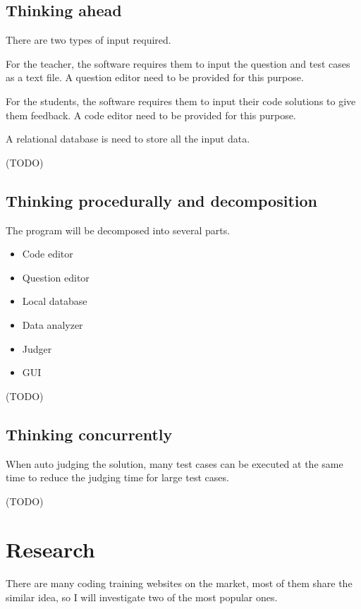 \documentclass[a4paper]{report}
\begin{document}
\subsection{Thinking ahead}

There are two types of input required.

For the teacher, the software requires them to input the question and test cases as a text file. A question editor need to be provided for this purpose.

For the students, the software requires them to input their code solutions to give them feedback. A code editor need to be provided for this purpose.

A relational database is need to store all the input data.

(TODO)

\subsection{Thinking procedurally and decomposition}

The program will be decomposed into several parts.

\begin{itemize}
    \item Code editor
    \item Question editor
    \item Local database
    \item Data analyzer
    \item Judger
    \item GUI
\end{itemize}

(TODO)

\subsection{Thinking concurrently}

When auto judging the solution, many test cases can be executed at the same time to reduce the judging time for large test cases.

(TODO)

\section{Research}

There are many coding training websites on the market, most of them share the similar idea, so I will investigate two of the most popular ones.
\end{document}
